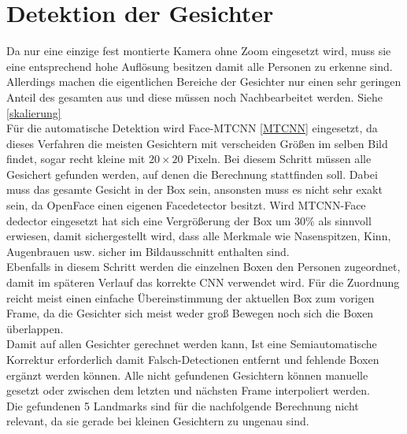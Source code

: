\section{Detektion der Gesichter}
\label{detection_Gesicht}
Da nur eine einzige fest montierte Kamera ohne Zoom eingesetzt wird, muss sie eine entsprechend hohe Auflösung besitzen damit alle Personen zu erkenne sind. Allerdings machen die eigentlichen Bereiche der Gesichter nur einen sehr geringen Anteil des gesamten aus und diese müssen noch Nachbearbeitet werden. Siehe \autoref{skalierung}\\
Für die automatische Detektion wird Face-MTCNN  \autoref{MTCNN} eingesetzt, da dieses Verfahren die meisten Gesichtern mit verscheiden Größen im selben Bild findet, sogar recht kleine mit $20\times 20$ Pixeln. Bei diesem Schritt müssen alle Gesichert gefunden werden, auf denen die Berechnung stattfinden soll. Dabei muss das gesamte Gesicht in der Box sein, ansonsten muss es nicht sehr exakt sein, da OpenFace einen eigenen Facedetector besitzt. Wird MTCNN-Face dedector eingesetzt hat sich eine Vergrößerung der Box um $30\%$ als sinnvoll erwiesen, damit sichergestellt wird, dass alle Merkmale wie Nasenspitzen, Kinn, Augenbrauen usw. sicher im Bildausschnitt enthalten sind.\\
Ebenfalls in diesem Schritt werden die einzelnen Boxen den Personen zugeordnet, damit im späteren Verlauf das korrekte CNN verwendet wird. Für die Zuordnung reicht meist einen einfache Übereinstimmung der aktuellen Box zum vorigen Frame, da die Gesichter sich meist weder groß Bewegen noch sich die Boxen überlappen.\\
Damit auf allen Gesichter gerechnet werden kann, Ist eine Semiautomatische Korrektur erforderlich damit Falsch-Detectionen entfernt und fehlende Boxen ergänzt werden können. Alle nicht gefundenen Gesichtern können manuelle gesetzt oder zwischen dem letzten und nächsten Frame interpoliert werden.\\
Die gefundenen 5 Landmarks sind für die nachfolgende Berechnung nicht relevant, da sie gerade bei kleinen Gesichtern zu ungenau sind.